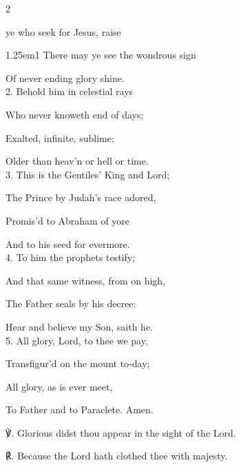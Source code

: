 \begin{paracol}{2}
\sloppy

\vspace{-1\baselineskip}

\firstEvensong
{}

\firstEvensongHymn
{} ye who seek for Jesus, raise


\begin{hangparas}{1.25em}{1}
There may ye see the wondrous sign

Of never ending glory shine.\\

2. Behold him in celestial rays

Who never knoweth end of days;

Exalted, infinite, sublime;

Older than heav'n or hell or time.\\

3. This is the Gentiles’ King and Lord;

The Prince by Judah's race adored,

Promis'd to Abraham of yore

And to his seed for evermore.\\

4. To him the prophets testify;

And that same witness, from on high,

The Father seals by his decree:

Hear and believe my Son, saith he.\\

5. All glory, Lord, to thee we pay,

Transfigur'd on the mount to-day;

All glory, as is ever meet,

To Father and to Paraclete. Amen.\\
\end{hangparas}

℣. Glorious didst thou appear in the sight of the Lord.

℟. Because the Lord hath clothed thee with majesty.



\end{paracol}
